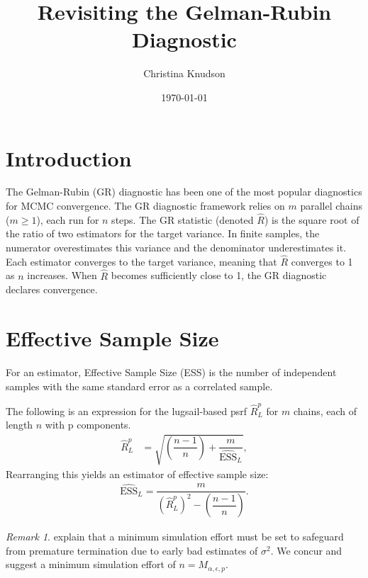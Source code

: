\documentclass[12pt]{article}
\theoremstyle{remark}
\newtheorem{remark}{Remark}
\begin{document}
\title{Revisiting the Gelman-Rubin Diagnostic}
\date{\today}
\author{Christina Knudson}
\maketitle


\section{Introduction} %
\label{sec:introduction}

The Gelman-Rubin (GR) diagnostic has been one of the most popular diagnostics for MCMC convergence. The GR diagnostic framework relies on  $m$  parallel chains ($m \geq 1$), each run for $n$ steps. The GR statistic (denoted $\hat{R}$) is the square root of the ratio of two estimators for the target variance.  In finite samples, the numerator overestimates this variance and the denominator underestimates it. Each estimator converges to the target variance, meaning that $\hat{R}$ converges to 1 as $n$ increases. When $\hat{R}$ becomes sufficiently close to 1, the GR diagnostic declares convergence. 











\section{Effective Sample Size} %
\label{sec:choosing_delta}

For an estimator, Effective Sample Size (ESS) is the number of independent samples with the same standard error as a correlated sample. 

The following is an expression for the lugsail-based psrf $\hat{R}^p_L$ for $m$  chains, each of length $n$ with  p components.
\begin{align*}
	\hat{R}^p_L &= \sqrt{ \left(\dfrac{n-1}{n} \right) + \dfrac{m}{\widehat{\text{ESS}}_L}},
\end{align*}
Rearranging this yields an estimator of effective sample size:
\begin{align*}
\widehat{\text{ESS}}_L = \dfrac{m}{\left( \hat{R}^p_L \right)^2 -  \left(\dfrac{n-1}{n} \right)}.
\end{align*}


\begin{remark}
	\label{rem:minimum_effort}
\cite{vats:fleg:jones:2018} explain that a minimum simulation effort must be set to safeguard from premature termination due to early bad estimates of $\sigma^2$. We concur and  suggest  a minimum simulation effort of $n = M_{\alpha, \epsilon,p}$. \\
\end{remark}
\end{document}

